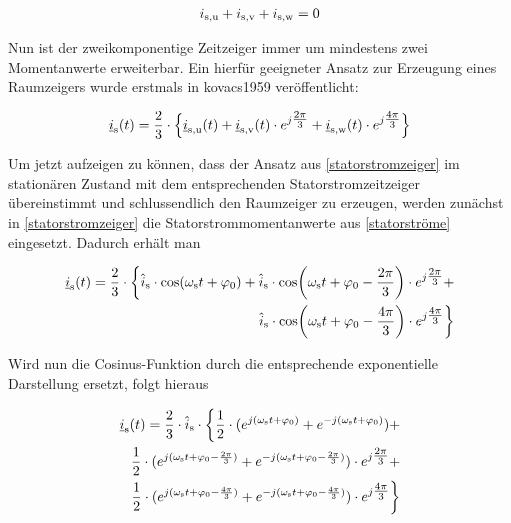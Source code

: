 \begin{align}
	i_\i{s,u} + i_\i{s,v} + i_\i{s,w} = 0 
	\label{knotengleichung}
\end{align}


Nun ist der zweikomponentige Zeitzeiger immer um mindestens zwei Momentanwerte erweiterbar. 
Ein hierfür geeigneter Ansatz zur Erzeugung eines Raumzeigers wurde erstmals in kovacs1959 veröffentlicht:

\begin{align}
	\underline{i}_{\mathrm{s}}(t) = \frac{2}{3} \cdot \Bigl\{\underline{i}_{\mathrm{s,u}}(t) + \underline{i}_{\mathrm{s,v}}(t)\cdot e^{j\tfrac{2\pi}{3}} + \underline{i}_{\mathrm{s,w}}(t)\cdot e^{j\tfrac{4\pi}{3}} \Bigr\} \label{statorstromzeiger}
\end{align}

Um jetzt aufzeigen zu können, dass der Ansatz aus \ref{statorstromzeiger} im stationären Zustand mit dem entsprechenden Statorstromzeitzeiger übereinstimmt und schlussendlich den Raumzeiger zu erzeugen, werden zunächst in \ref{statorstromzeiger} die Statorstrommomentanwerte aus \ref{statorströme} eingesetzt.
Dadurch erhält man

\begin{align}
	\begin{split}
\underline{i}_\i{s}(t) = \frac{2}{3} \cdot \biggl\{\hat{i}_\i{s}\cdot\si{cos}(\omega_\i{s}t+\varphi_{0}) + \hat{i}_\i{s}\cdot\si{cos}\bigg(\omega_\i{s}t+\varphi_{0}-\frac{2\pi}{3}\bigg)\cdot e^{j\tfrac{2\pi}{3}} + \\ \hat{i}_\i{s}\cdot\si{cos}\bigg(\omega_\i{s}t+\varphi_\i{0}-\frac{4\pi}{3}\bigg)\cdot e^{j\tfrac{4\pi}{3}} \biggr\}
\label{zwischen1}
\end{split}
\end{align}

Wird nun die Cosinus-Funktion durch die entsprechende exponentielle Darstellung ersetzt, folgt hieraus

\begin{align}
	\begin{split}
	\underline{i}_\i{s}(t) = \frac{2}{3} \cdot \hat{i}_\i{s} \cdot \biggl\{ \frac{1}{2} \cdot ( e^{j(\omega_\i{s}t+\varphi_\i{0})} + e^{-j(\omega_\i{s}t+\varphi_\i{0})} ) + \\ \frac{1}{2} \cdot ( e^{j(\omega_\i{s}t+\varphi_\i{0}-\frac{2\pi}{3})} + e^{-j(\omega_\i{s}t+\varphi_\i{0}-\frac{2\pi}{3})})\cdot e^{j\tfrac{2\pi}{3}} + \\ \frac{1}{2} \cdot ( e^{j(\omega_\i{s}t+\varphi_\i{0}-\frac{4\pi}{3})} + e^{-j(\omega_\i{s}t+\varphi_\i{0}-\frac{4\pi}{3})})\cdot e^{j\tfrac{4\pi}{3}}  \biggr\}
	\label{zwischen2}
	\end{split}
\end{align}

